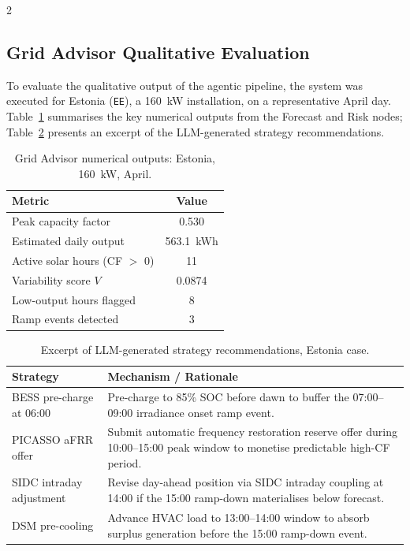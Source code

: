 \documentclass[11pt]{article}
\begin{document}
\begin{multicols}{2}
\subsection{Grid Advisor Qualitative Evaluation}

To evaluate the qualitative output of the agentic pipeline, the system was
executed for Estonia (\texttt{EE}), a 160~kW installation, on a representative
April day. Table~\ref{tab:advisor_output} summarises the key numerical outputs
from the Forecast and Risk nodes; Table~\ref{tab:strategies} presents an
excerpt of the LLM-generated strategy recommendations.

\begin{table}[H]
  \centering
  \caption{Grid Advisor numerical outputs: Estonia, 160~kW, April.}
  \label{tab:advisor_output}
  \small
  \begin{tabular}{lc}
    \toprule
    \textbf{Metric} & \textbf{Value} \\
    \midrule
    Peak capacity factor          & 0.530 \\
    Estimated daily output        & 563.1~kWh \\
    Active solar hours (CF $>$ 0) & 11 \\
    Variability score $V$         & 0.0874 \\
    Low-output hours flagged      & 8 \\
    Ramp events detected          & 3 \\
    \bottomrule
  \end{tabular}
\end{table}

\begin{table}[H]
  \centering
  \caption{Excerpt of LLM-generated strategy recommendations, Estonia case.}
  \label{tab:strategies}
  \small
  \begin{tabularx}{\columnwidth}{lX}
    \toprule
    \textbf{Strategy} & \textbf{Mechanism / Rationale} \\
    \midrule
    BESS pre-charge at 06:00 &
      Pre-charge to 85\% SOC before dawn to buffer the
      07:00--09:00 irradiance onset ramp event. \\
    \addlinespace
    PICASSO aFRR offer &
      Submit automatic frequency restoration reserve offer
      during 10:00--15:00 peak window to monetise predictable
      high-CF period. \\
    \addlinespace
    SIDC intraday adjustment &
      Revise day-ahead position via SIDC intraday coupling at
      14:00 if the 15:00 ramp-down materialises below forecast. \\
    \addlinespace
    DSM pre-cooling &
      Advance HVAC load to 13:00--14:00 window to absorb
      surplus generation before the 15:00 ramp-down event. \\
    \bottomrule
  \end{tabularx}
\end{table}


\end{multicols}
\end{document}
